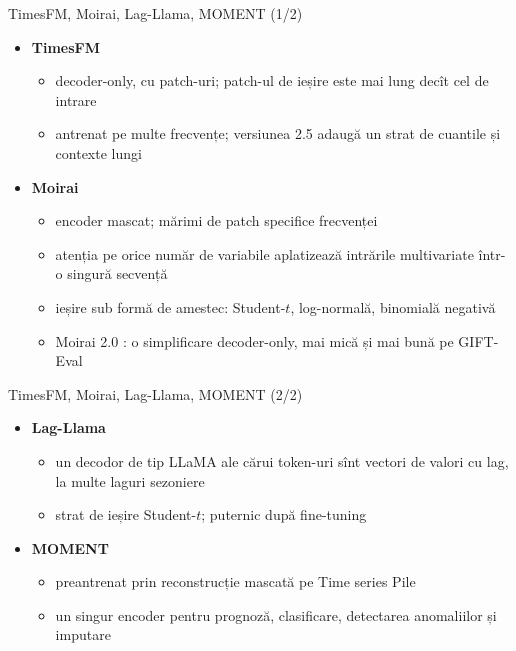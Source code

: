 \begin{frame}{TimesFM, Moirai, Lag-Llama, MOMENT (1/2)}
\itemsize{\small}
\begin{itemize}
    \item \textbf{TimesFM} 
    \begin{itemize}
        \item decoder-only, cu patch-uri; patch-ul de ieșire este mai lung decît cel de intrare
        \item antrenat pe multe frecvențe; versiunea 2.5 adaugă un strat de cuantile și contexte lungi
    \end{itemize}
    \item \textbf{Moirai} 
    \begin{itemize}
        \item encoder mascat; mărimi de patch specifice frecvenței
        \item atenția pe orice număr de variabile aplatizează intrările multivariate într-o singură secvență
        \item ieșire sub formă de amestec: Student-$t$, log-normală, binomială negativă
        \item Moirai 2.0 : o simplificare decoder-only, mai mică și mai bună pe GIFT-Eval
    \end{itemize}
\end{itemize}
\end{frame}

\begin{frame}{TimesFM, Moirai, Lag-Llama, MOMENT (2/2)}
\itemsize{\small}
\begin{itemize}
    \item \textbf{Lag-Llama} 
    \begin{itemize}
        \item un decodor de tip LLaMA ale cărui token-uri sînt vectori de valori cu lag, la multe laguri sezoniere
        \item strat de ieșire Student-$t$; puternic după fine-tuning
    \end{itemize}
    \item \textbf{MOMENT} 
    \begin{itemize}
        \item preantrenat prin reconstrucție mascată pe Time series Pile
        \item un singur encoder pentru prognoză, clasificare, detectarea anomaliilor și imputare
    \end{itemize}
\end{itemize}
\end{frame}


